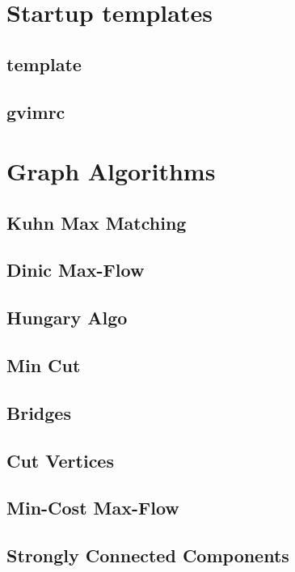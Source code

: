 \documentclass[10pt]{article}
\begin{document}
\tableofcontents



\newpage
\section{Startup templates}
\subsection{template}

\subsection{gvimrc}




\newpage
\section{Graph Algorithms}
\subsection{Kuhn Max Matching}

\subsection{Dinic Max-Flow}

\subsection{Hungary Algo}

\subsection{Min Cut}

\subsection{Bridges}

\subsection{Cut Vertices}

\subsection{Min-Cost Max-Flow}

\subsection{Strongly Connected Components}

\end{document}
